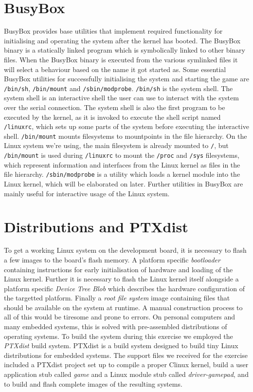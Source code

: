 \section{BusyBox}

BusyBox provides base utilities that implement required functionality for
initialising and operating the system after the kernel has booted. The BusyBox
binary is a statically linked program which is symbolically linked to other
binary files. When the BusyBox binary is executed from the various symlinked
files it will select a behaviour based on the name it got started as. Some
essential BusyBox utilities for successfully initialising the system and
starting the game are \texttt{/bin/sh}, \texttt{/bin/mount} and
\texttt{/sbin/modprobe}. \texttt{/bin/sh} is the system shell. The system shell is
an interactive shell the user can use to interact with the system over the
serial connection. The system shell is also the first program to be executed by
the kernel, as it is invoked to execute the shell script named
\texttt{/linuxrc}, which sets up some parts of the system before executing the
interactive shell. \texttt{/bin/mount} mounts filesystems to mountpoints in the
file hierarchy. On the Linux system we're using, the main filesystem is already
mounted to \texttt{/}, but \texttt{/bin/mount} is used during \texttt{/linuxrc}
to mount the \texttt{/proc} and \texttt{/sys} filesystems, which represent
information and interfaces from the Linux kernel as files in the file hierarchy.
\texttt{/sbin/modprobe} is a utility which loads a kernel module into the Linux
kernel, which will be elaborated on later. Further utilities in BusyBox are
mainly useful for interactive usage of the Linux system.

\section{Distributions and PTXdist}

To get a working Linux system on the development board, it is necessary to flash
a few images to the board's flash memory. A platform specific \emph{bootloader}
containing instructions for early initialisation of hardware and loading of the
Linux kernel. Further it is necessary to flash the Linux kernel itself alongside
a platform specific \emph{Device Tree Blob} which describes the hardware
configuration of the targetted platform. Finally a \emph{root file system} image
containing files that should be available on the system at runtime. A manual
construction process to all of this would be tiresome and prone to errors. On
personal computers and many embedded systems, this is solved with pre-assembled
distributions of operating systems. To build the system during this exercise we
employed the \emph{PTXdist} build system. PTXdist is a build system designed to
build tiny Linux distributions for embedded systems. The support files we
received for the exercise included a PTXdist project set up to compile a proper
\textmu Clinux kernel, build a user application stub called \emph{game} and a
Linux module stub called \emph{driver-gamepad}, and to build and flash complete
images of the resulting systems.

